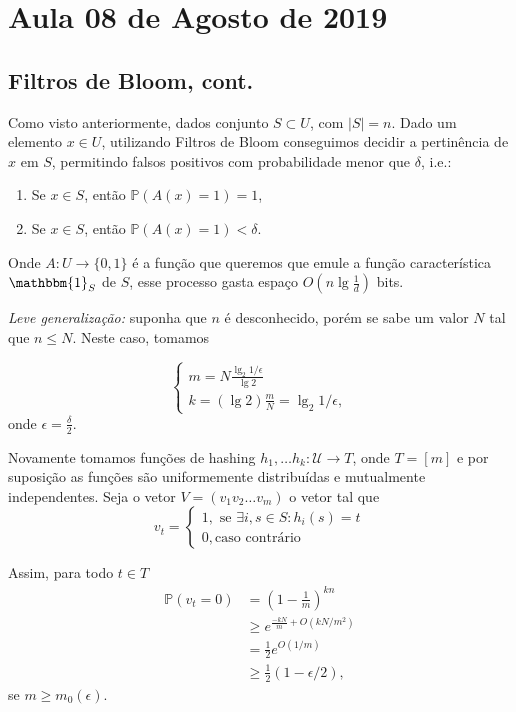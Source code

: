 \section{Aula 08 de Agosto de 2019}
\label{2019_08_08}

\subsection{Filtros de Bloom, cont.}
Como visto anteriormente, dados conjunto $S\subset U$, com $|S|=n$. Dado um elemento $x\in U$, utilizando Filtros de Bloom conseguimos decidir a pertinência de $x$ em $S$, permitindo falsos positivos com probabilidade menor que $\delta$, i.e.:
\begin{enumerate}
    \item Se $x\in S$, então $\mathbb{P}(A(x)=1)=1$,
    \item Se $x\in S$, então $\mathbb{P}(A(x)=1)< \delta$.
\end{enumerate}

Onde $A:U \to \{0,1\}$ \'e a fun\c{c}\~ao que queremos que emule a fun\c{c}\~ao caracter\'istica $\mathbbm{1}_S$ de $S$, esse processo gasta espa\c{c}o $O(n \lg{\frac{1}{d}})$ bits.

\textit{Leve generaliza\c{c}\~ao:} suponha que $n$ \'e desconhecido, por\'em se sabe um valor $N$ tal que $n \le N$. Neste caso, tomamos

\[\begin{cases}
m = N \frac{\lg_2{1/\epsilon}}{\lg 2}
\\k= (\lg 2)\frac{m}{N}= \lg_2{1/\epsilon},
\end{cases}
\]
onde  $\epsilon = \frac{\delta}{2}$.

Novamente tomamos fun\c{c}\~oes de hashing $h_1,\dots h_k: \mathcal{U} \to T$, onde $T = [m]$ e por suposi\c{c}\~ao as fun\c{c}\~oes s\~ao uniformemente distribu\'idas e mutualmente independentes. Seja o vetor $V=(v_1 v_2 \dots v_m)$ o vetor tal que 
\[v_t = \begin{cases}
1, \text{ se } \exists i, s\in S: h_i(s)=t
\\0, \text{caso contr\'ario}
\end{cases}\]

Assim, para todo $t\in T$
\begin{align*}
  \mathbb{P}(v_t=0)&= \left(1-\frac{1}{m}\right)^{kn}\\
                    &\ge e^{\frac{-kN}{m}+O(kN/m^2)}\\
                    &=\frac{1}{2}e^{O(1/m)}\\
                    &\ge \frac{1}{2}(1-\epsilon/2),
\end{align*}
se $m\ge m_0(\epsilon)$.

